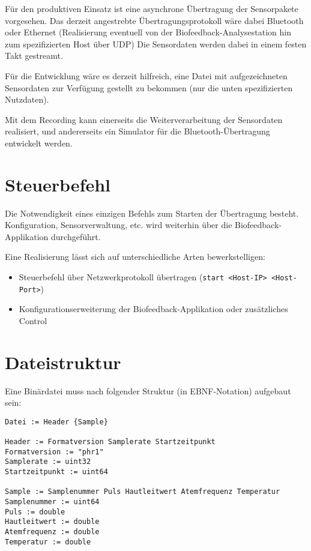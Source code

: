 \documentclass[a4paper,parskip=full,oneside]{scrartcl}
\begin{document}
Für den produktiven Einsatz ist eine asynchrone Übertragung der Sensorpakete vorgesehen.
Das derzeit angestrebte Übertragungsprotokoll wäre dabei Bluetooth oder Ethernet
(Realisierung eventuell von der Biofeedback-Analysestation hin zum spezifizierten Host über UDP)
Die Sensordaten werden dabei in einem festen Takt gestreamt.

Für die Entwicklung wäre es derzeit hilfreich, eine Datei mit aufgezeichneten Sensordaten
zur Verfügung gestellt zu bekommen (nur die unten spezifizierten Nutzdaten).

Mit dem Recording kann einerseits die Weiterverarbeitung der Sensordaten realisiert,
und andererseits ein Simulator für die Bluetooth-Übertragung entwickelt werden.

\section{Steuerbefehl}

Die Notwendigkeit eines einzigen Befehls zum Starten der Übertragung besteht.
Konfiguration, Sensorverwaltung, etc. wird weiterhin über die Biofeedback-Applikation durchgeführt.

Eine Realisierung lässt sich auf unterschiedliche Arten bewerkstelligen:
\begin{itemize}
\item Steuerbefehl über Netzwerkprotokoll übertragen (\texttt{start <Host-IP> <Host-Port>})
\item Konfigurationserweiterung der Biofeedback-Applikation oder zusätzliches Control
\end{itemize}


\section{Dateistruktur}

Eine Binärdatei muss nach folgender Struktur (in EBNF-Notation) aufgebaut sein:

\begin{verbatim}
Datei := Header {Sample}

Header := Formatversion Samplerate Startzeitpunkt
Formatversion := "phr1"
Samplerate := uint32
Startzeitpunkt := uint64

Sample := Samplenummer Puls Hautleitwert Atemfrequenz Temperatur
Samplenummer := uint64
Puls := double
Hautleitwert := double
Atemfrequenz := double
Temperatur := double
\end{verbatim}
\end{document}

